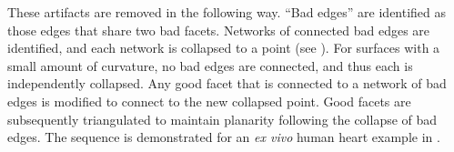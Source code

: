 These artifacts are removed in the following way.  ``Bad edges'' are identified as those edges that share two bad facets. Networks of connected bad edges are identified, and each network is collapsed to a point (see ). For surfaces with a small amount of curvature, no bad edges are connected, and thus each is independently collapsed. Any good facet that is connected to a network of bad edges is modified to connect to the new collapsed point.  Good facets are subsequently triangulated to maintain planarity following the collapse of bad edges. The sequence is demonstrated for an \textit{ex vivo} human heart example in .

\begin{figure}[h!]
\centering
{}	
\subfigure[]{%
}
\end{figure}

